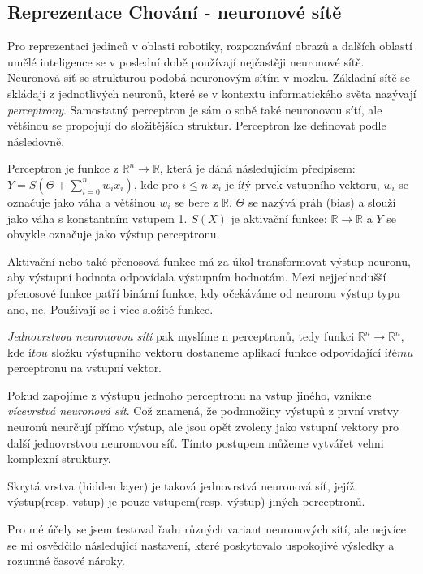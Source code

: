 \subsection*{Reprezentace Chování - neuronové sítě}
Pro reprezentaci jedinců v oblasti robotiky, rozpoznávání obrazů a dalších oblastí umělé inteligence se v poslední době používají nejčastěji neuronové sítě. Neuronová síť se strukturou podobá neuronovým sítím v mozku. Základní sítě se skládají z jednotlivých neuronů, které se v kontextu informatického světa nazývají \textit{perceptrony}. Samostatný perceptron je sám o sobě také neuronovou sítí, ale většinou se propojují do složitějších struktur. Perceptron lze definovat podle \citep{neuron} následovně.
\begin{definice}[Perceptron] Perceptron je funkce z $\mathbb{R}^n \rightarrow \mathbb{R}$, která je dáná následujícím předpisem: 	$Y = S(\Theta + \sum_{i=0}^{n} w_i x_i)$, kde pro $i \leq n$ $x_{i}$ je $ítý$ prvek vstupního vektoru, $w_{i}$ se označuje jako váha a většinou $w_{i} $ se bere z $\mathbb{R}$.  $\Theta$ se nazývá práh (bias) a slouží jako váha s konstantním vstupem 1.  $S(X)$ je aktivační funkce: $\mathbb{R} \rightarrow \mathbb{R}$ a $Y$ se obvykle označuje jako výstup perceptronu.
\end{definice}
Aktivační nebo také přenosová funkce má za úkol transformovat výstup neuronu, aby výstupní hodnota odpovídala výstupním hodnotám. Mezi nejjednodušší přenosové funkce patří binární funkce, kdy očekáváme od neuronu výstup typu ano, ne. Používají se i více složité funkce.
\par
\textit{Jednovrstvou neuronovou sítí} pak myslíme n perceptronů, tedy funkci $\mathbb{R}^{n} \rightarrow \mathbb{R}^{n}$, kde $ítou$ složku výstupního vektoru dostaneme aplikací funkce odpovídající $ítému$ perceptronu na vstupní vektor.
\par
Pokud zapojíme z výstupu jednoho perceptronu na vstup jiného, vznikne \textit{vícevrstvá neuronová sít}. Což znamená, že podmnožiny výstupů z první vrstvy neuronů neurčují přímo výstup, ale jsou opět zvoleny jako vstupní vektory pro další jednovrstvou neuronovou síť. Tímto postupem můžeme vytvářet velmi komplexní struktury.
\par
Skrytá vrstva (hidden layer) je taková jednovrstvá neuronová síť, jejíž výstup(resp. vstup) je pouze vstupem(resp. výstup) jiných perceptronů.
\par
Pro mé účely se jsem testoval řadu různých variant neuronových sítí, ale nejvíce se mi osvědčilo následující nastavení, které poskytovalo uspokojivé výsledky a rozumné časové nároky. 

